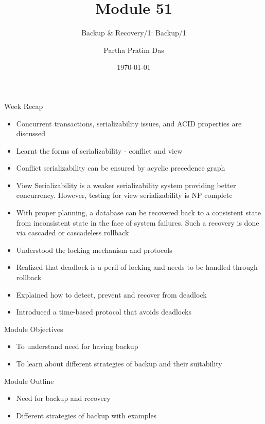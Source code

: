 \documentclass[aspectratio=169, xcolor=dvipsnames]{beamer}
\title{Module 51}
\subtitle{Backup \& Recovery/1: Backup/1}
\author{Partha Pratim Das}
\institute{Department of Computer Science and Engineering\\Indian Institute of Technology, Kharagpur\\ppd@cse.iitkgp.ac.in}
\date{\today}
\begin{document}
\begin{frame}
    \titlepage
\end{frame}

\begin{frame}{Week Recap}
    \begin{itemize}[<+->]
        \item Concurrent transactions, serializability issues, and ACID properties are discussed
        \item Learnt the forms of serializability - conflict and view
        \item Conflict serializability can be ensured by acyclic precedence graph
        \item View Serializability is a weaker serializability system providing better concurrency. However, testing for view serializability is NP complete
        \item With proper planning, a database can be recovered back to a consistent state from inconsistent state in the face of system failures. Such a recovery is done via cascaded or cascadeless rollback
        \item Understood the locking mechanism and protocols
        \item Realized that deadlock is a peril of locking and needs to be handled through rollback
        \item Explained how to detect, prevent and recover from deadlock
        \item Introduced a time-based protocol that avoids deadlocks
    \end{itemize}
\end{frame}

\begin{frame}{Module Objectives}
    \begin{itemize}[<+->]
        \item To understand need for having backup
        \item To learn about different strategies of backup and their suitability
    \end{itemize}
\end{frame}

\begin{frame}{Module Outline}
    \begin{itemize}[<+->]
        \item Need for backup and recovery
        \item Different strategies of backup with examples
    \end{itemize}
\end{frame}
\end{document}
